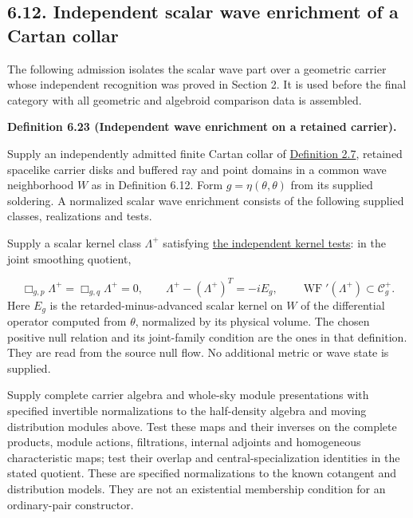 \documentclass[
  english,
  11pt,
  reqno]{amsart}
\makeatletter
\newcommand{\pandocstatementheading}[1]{%
  \par\addpenalty{\@beginparpenalty}%
  \addvspace{.5\baselineskip plus .2\baselineskip minus .2\baselineskip}%
  {\normalfont\bfseries #1\par}%
  \nobreak\@afterindenttrue\@afterheading
}
\makeatother
\begin{document}
\subsection{6.12. Independent scalar wave enrichment of a Cartan
collar}\label{independent-scalar-wave-enrichment-of-a-cartan-collar}\label{sec:online-independent-wave-enrichment}

The following admission isolates the scalar wave part over a geometric
carrier whose independent recognition was proved in Section 2. It is
used before the final category with all geometric and algebroid
comparison data is assembled.

\pandocstatementheading{\leavevmode{}\label{def:online-independent-wave-enrichment}Definition 6.23 (Independent wave enrichment on a retained carrier).}

Supply an independently admitted finite Cartan collar of
\hyperref[def:online-finite-cartan-collar]{Definition 2.7}, retained
spacelike carrier disks and buffered ray and point domains in a common
wave neighborhood \(W\) as in Definition 6.12. Form
\(g=\eta(\theta,\theta)\) from its supplied soldering. A normalized
scalar wave enrichment consists of the following supplied classes,
realizations and tests.

Supply a scalar kernel class \(\Lambda^+\) satisfying
\hyperref[def:online-independent-wave-kernel]{the independent kernel
tests}: in the joint smoothing quotient,

\label{eq:online-independent-enrichment-kernel-tests} \[
\Box_{g,p}\Lambda^+=\Box_{g,q}\Lambda^+=0,
\qquad
\Lambda^+-(\Lambda^+)^T=-iE_g,
\qquad
\operatorname{WF}'(\Lambda^+)\subset\mathcal C_g^+.
\] Here \(E_g\) is the retarded-minus-advanced scalar kernel on \(W\) of
the differential operator computed from \(\theta\), normalized by its
physical volume. The chosen positive null relation and its joint-family
condition are the ones in that definition. They are read from the source
null flow. No additional metric or wave state is supplied.

Supply complete carrier algebra and whole-sky module presentations with
specified invertible normalizations to the half-density algebra and
moving distribution modules above. Test these maps and their inverses on
the complete products, module actions, filtrations, internal adjoints
and homogeneous characteristic maps; test their overlap and
central-specialization identities in the stated quotient. These are
specified normalizations to the known cotangent and distribution models.
They are not an existential membership condition for an ordinary-pair
constructor.
\end{document}
